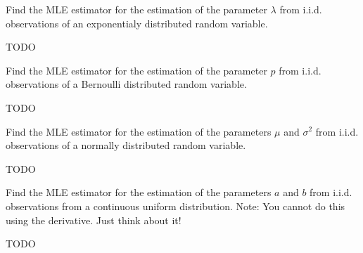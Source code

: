 
Find the MLE estimator for the estimation of the parameter $\lambda$ from
i.i.d. observations of an exponentialy distributed random variable.


TODO


Find the MLE estimator for the estimation of the parameter $p$ from
i.i.d. observations of a Bernoulli distributed random variable.


TODO


Find the MLE estimator for the estimation of the parameters $\mu$ and $\sigma^2$
from i.i.d. observations of a normally distributed random variable.


TODO


Find the MLE estimator for the estimation of the parameters $a$ and $b$
from i.i.d. observations from a continuous uniform distribution. Note:
You cannot do this using the derivative. Just think about it!


TODO
